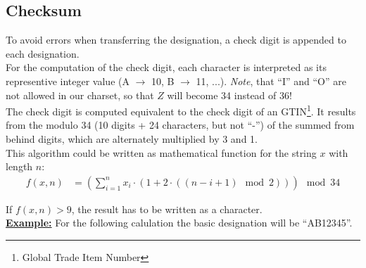 %
%
%
%
%
%
%

\subsection{Checksum}

To avoid errors when transferring the designation, a check digit is appended to
each designation. \\

For the computation of the check digit, each character is interpreted as its
representive integer value (A $\rightarrow$ 10, B $\rightarrow$ 11, ...).
\textit{Note}, that ``I'' and ``O'' are not allowed in our charset, so that $Z$
will become 34 instead of 36! \\

The check digit is computed equivalent to the check digit of an
GTIN\footnote{Global Trade Item Number}. It results from the modulo 34 (10
digits + 24 characters, but not ``-'') of the summed from behind digits, which
are alternately multiplied by 3 and 1. \\


This algorithm could be written as mathematical function for the string $x$ with
length $n$:
\begin{align*}
	f(x, n) &= \left(\sum_{i=1}^{n} x_i \cdot \left(1 + 2 \cdot \left( \left(
		n - i + 1 \right) \mod 2 \right) \right) \right) \mod 34
\end{align*}

If $f(x, n) > 9$, the result has to be written as a character. \\


\textbf{\underline{Example:}}
For the following calulation the basic designation will be ``AB12345''.

